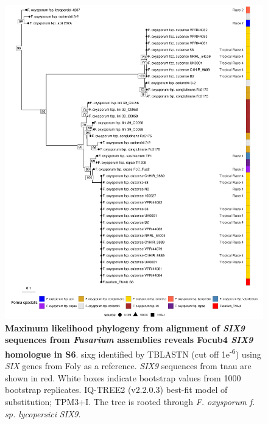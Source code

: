 \begin{figure}[htp!]
  \centering
  \includegraphics[width=\textwidth]{Figures/FusSIX9.phylo.png}
  \caption[Maximum likelihood phylogeny from alignment of \textit{SIX9} sequences from \textit{Fusarium} assemblies]{\textbf{Maximum likelihood phylogeny from alignment of \textit{SIX9} sequences from \textit{Fusarium} assemblies reveals \acl{Focub4} \textit{SIX9} homologue in S6}. \acl{sixg} identified by TBLASTN (cut off 1e\textsuperscript{-6}) using \textit{SIX} genes from \acl{Foly} as a reference. \textit{SIX9} sequences from \ac{tnau} are shown in red. White boxes indicate bootstrap values from 1000 bootstrap replicates. IQ-TREE2 (v2.2.0.3) best-fit model of substitution; TPM3+I. The tree is rooted through \textit{F. oxysporum f. sp. lycopersici} \textit{SIX9}.}
  \label{fig:FusSIX9}
\end{figure}

